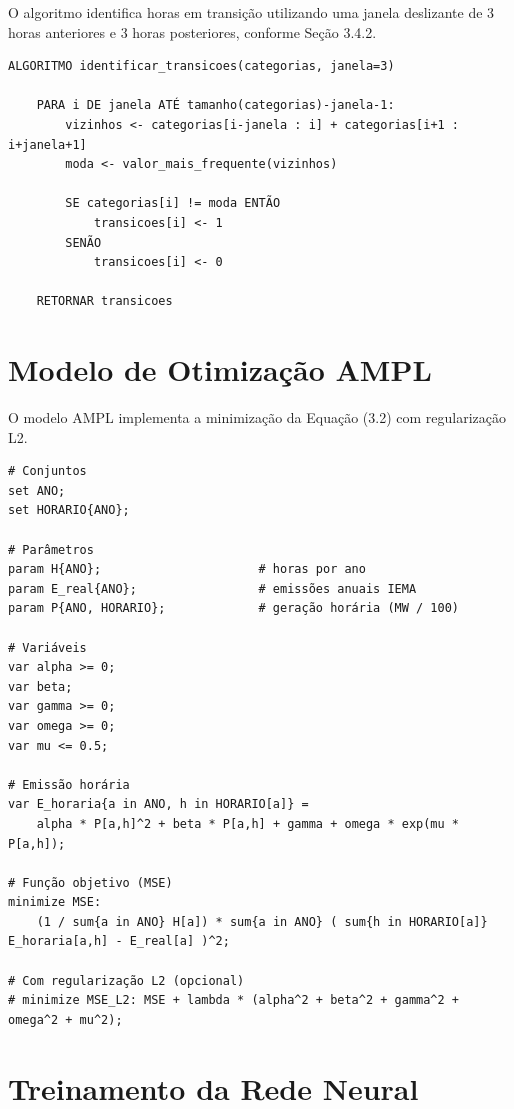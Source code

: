 O algoritmo identifica horas em transição utilizando uma janela deslizante de 3 horas anteriores e 3 horas posteriores, conforme Seção 3.4.2.

\begin{Verbatim}[breaklines=true, frame=single]
ALGORITMO identificar_transicoes(categorias, janela=3)
    
    PARA i DE janela ATÉ tamanho(categorias)-janela-1:
        vizinhos <- categorias[i-janela : i] + categorias[i+1 : i+janela+1]
        moda <- valor_mais_frequente(vizinhos)
        
        SE categorias[i] != moda ENTÃO
            transicoes[i] <- 1
        SENÃO
            transicoes[i] <- 0
    
    RETORNAR transicoes
\end{Verbatim}

\section{Modelo de Otimização AMPL}

O modelo AMPL implementa a minimização da Equação (3.2) com regularização L2.

\begin{Verbatim}[breaklines=true, frame=single]
# Conjuntos
set ANO;
set HORARIO{ANO};

# Parâmetros
param H{ANO};                      # horas por ano
param E_real{ANO};                 # emissões anuais IEMA
param P{ANO, HORARIO};             # geração horária (MW / 100)

# Variáveis
var alpha >= 0;
var beta;
var gamma >= 0;
var omega >= 0;
var mu <= 0.5;

# Emissão horária
var E_horaria{a in ANO, h in HORARIO[a]} =
    alpha * P[a,h]^2 + beta * P[a,h] + gamma + omega * exp(mu * P[a,h]);

# Função objetivo (MSE)
minimize MSE:
    (1 / sum{a in ANO} H[a]) * sum{a in ANO} ( sum{h in HORARIO[a]} E_horaria[a,h] - E_real[a] )^2;

# Com regularização L2 (opcional)
# minimize MSE_L2: MSE + lambda * (alpha^2 + beta^2 + gamma^2 + omega^2 + mu^2);
\end{Verbatim}

\section{Treinamento da Rede Neural}

